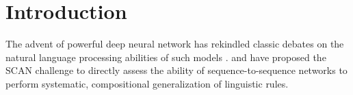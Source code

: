 \section{Introduction}
\label{sec:intro}

The advent of powerful deep neural network has rekindled classic
debates on the natural language processing abilities of such models
\cite[e.g.,][]{Kirov:Cotterell:2018,Linzen:etal:2018,McCoy:etal:2018,Pater:2018}. \citet{Lake:Baroni:2017}
and \citet{Loula:etal:2018} have proposed the SCAN challenge to
directly assess the ability of sequence-to-sequence networks to
perform systematic, compositional generalization of linguistic rules.




